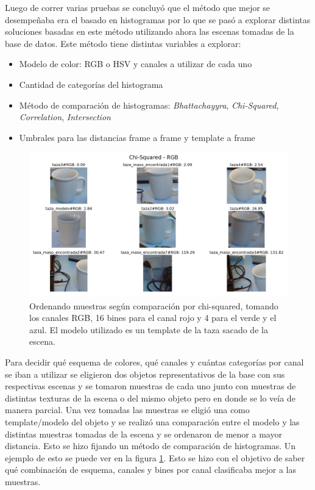 Luego de correr varias pruebas se concluyó que el método que mejor se desempeñaba era el basado en histogramas por lo que se pasó a explorar distintas soluciones basadas en este método utilizando ahora las escenas tomadas de la base de datos. Este método tiene distintas variables a explorar:
\begin{itemize}
	\item Modelo de color: RGB o HSV y canales a utilizar de cada uno
	\item Cantidad de categorías del histograma
	\item Método de comparación de histogramas: \textit{Bhattachayyra}, \textit{Chi-Squared}, \textit{Correlation}, \textit{Intersection}
	\item Umbrales para las distancias frame a frame y template a frame
\end{itemize}


\begin{figure}
	\centering
	\includegraphics[width=\textwidth]{img/results_chi-squared_rgb_16r_4g_4b.png}
	\caption{Ordenando muestras según comparación por chi-squared, tomando los canales RGB, 16 bines para el canal rojo y 4 para el verde y el azul. El modelo utilizado es un template de la taza sacado de la escena.}
	\label{pruebas_eleccion_canales}
\end{figure}

Para decidir qué esquema de colores, qué canales y cuántas categorías por canal se iban a utilizar se eligieron dos objetos representativos de la base con sus respectivas escenas y se tomaron muestras de cada uno junto con muestras de distintas texturas de la escena o del mismo objeto pero en donde se lo veía de manera parcial. Una vez tomadas las muestras se eligió una como template/modelo del objeto y se realizó una comparación entre el modelo y las distintas muestras tomadas de la escena y se ordenaron de menor a mayor distancia. Esto se hizo fijando un método de comparación de histogramas. Un ejemplo de esto se puede ver en la figura \ref{pruebas_eleccion_canales}. Esto se hizo con el objetivo de saber qué combinación de esquema, canales y bines por canal clasificaba mejor a las muestras.


